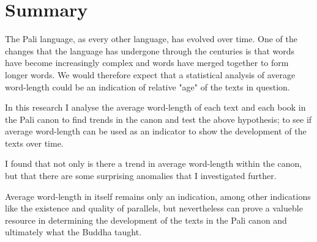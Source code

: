 \section{Summary}
The Pali language, as every other language, has evolved over time. One of the changes that the language has undergone through the centuries is that words have become increasingly complex and words have merged together to form longer words. We would therefore expect that a statistical analysis of average word-length could be an indication of relative "age" of the texts in question. 

In this research I analyse the average word-length of each text and each book in the Pali canon to find trends in the canon and test the above hypothesis; to see if average word-length can be used as an indicator to show the development of the texts over time.

I found that not only is there a trend in average word-length within the canon, but that there are some surprising anomalies that I investigated further.

Average word-length in itself remains only an indication, among other indications like the existence and quality of parallels, but nevertheless can prove a valueble resource in determining the development of the texts in the Pali canon and ultimately what the Buddha taught.
